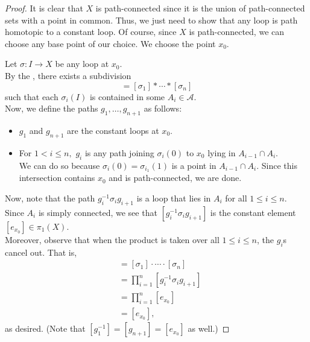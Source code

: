 \documentclass[12pt]{article}
\begin{document}
\begin{proof} 
	It is clear that $X$ is path-connected since it is the union of path-connected sets with a point in common. Thus, we just need to show that any loop is path homotopic to a constant loop. Of course, since $X$ is path-connected, we can choose any base point of our choice. We choose the point $x_0.$ 

	Let $\sigma:I \to X$ be any loop at $x_0.$\\
	By the , there exists a subdivision
	\begin{equation*} 
		[\sigma] = [\sigma_1]*\cdots*[\sigma_n]
	\end{equation*}
	such that each $\sigma_i(I)$ is contained in some $A_i \in \mathcal{A}.$ \\
	Now, we define the paths $g_1, \ldots, g_{n+1}$ as follows:
	\begin{itemize}
		\item $g_1$ and $g_{n+1}$ are the constant loops at $x_0.$
		\item For $1 < i \le n,$ $g_i$ is any path joining $\sigma_i(0)$ to $x_0$ lying in $A_{i-1} \cap A_i.$ \\
		We can do so because $\sigma_i(0) = \sigma_{i_1}(1)$ is a point in $A_{i-1} \cap A_i.$ Since this intersection contains $x_0$ and is path-connected, we are done.
	\end{itemize}
	Now, note that the path $g_i^{-1}\sigma_ig_{i+1}$ is a loop that lies in $A_i$ for all $1 \le i \le n.$ Since $A_i$ is simply connected, we see that $[g_i^{-1}\sigma_ig_{i+1}]$ is the constant element $[e_{x_0}] \in \pi_1(X).$\\
	Moreover, observe that when the product is taken over all $1 \le i \le n$, the $g_i$s cancel out. That is,
	\begin{align*} 
		[\sigma] &= [\sigma_1]\cdot\cdots\cdot[\sigma_n]\\
		&= \prod_{i = 1}^{n}[g_i^{-1}\sigma_ig_{i+1}]\\
		&= \prod_{i = 1}^{n}[e_{x_0}]\\
		&= [e_{x_0}],
	\end{align*}
	as desired. (Note that $[g_1^{-1}] = [g_{n+1}] = [e_{x_0}]$ as well.)
\end{proof}
\end{document}
